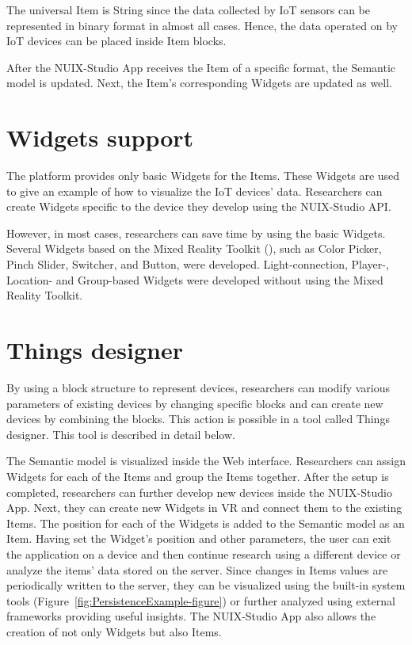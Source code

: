 The universal Item is String since the data collected by IoT sensors can be represented in binary format in almost all cases. Hence, the data operated on by IoT devices can be placed inside Item blocks.

After the NUIX-Studio App receives the Item of a specific format, the Semantic model is updated. Next, the Item's corresponding Widgets are updated as well.

\section{Widgets support}

The platform provides only basic Widgets for the Items. These Widgets are used to give an example of how to visualize the IoT devices' data. Researchers can create Widgets specific to the device they develop using the NUIX-Studio API.

However, in most cases, researchers can save time by using the basic Widgets. Several Widgets based on the Mixed Reality Toolkit (\cite{MRTK2021}), such as Color Picker, Pinch Slider, Switcher, and Button, were developed. Light-connection, Player-, Location- and Group-based Widgets were developed without using the Mixed Reality Toolkit.

\section{Things designer}

By using a block structure to represent devices, researchers can modify various parameters of existing devices by changing specific blocks and can create new devices by combining the blocks. This action is possible in a tool called Things designer. This tool is described in detail below.

The Semantic model is visualized inside the Web interface. Researchers can assign Widgets for each of the Items and group the Items together. After the setup is completed, researchers can further develop new devices inside the NUIX-Studio App. Next, they can create new Widgets in VR and connect them to the existing Items. The position for each of the Widgets is added to the Semantic model as an Item. Having set the Widget's position and other parameters, the user can exit the application on a device and then continue research using a different device or analyze the items' data stored on the server. Since changes in Items values are periodically written to the server, they can be visualized using the built-in system tools (Figure~\ref{fig:PersistenceExample-figure}) or further analyzed using external frameworks providing useful insights. The NUIX-Studio App also allows the creation of not only Widgets but also Items.

